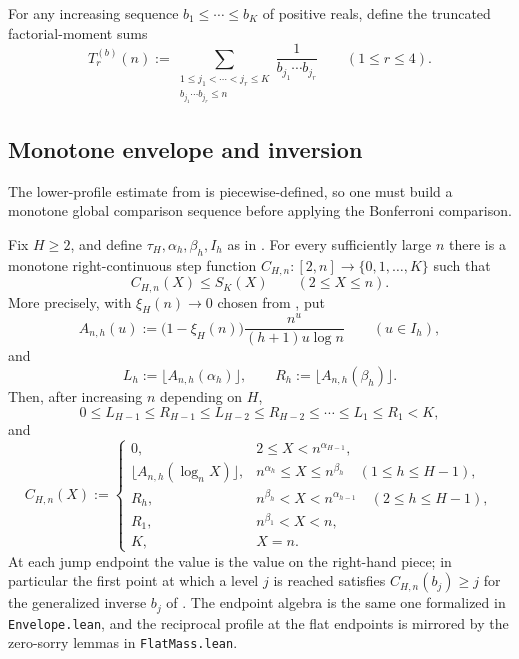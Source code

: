 For any increasing sequence $b_1\le \cdots \le b_K$ of positive reals, define
the truncated factorial-moment sums
\[
  T_r^{(b)}(n)
  :=
  \sum_{\substack{1\le j_1<\cdots<j_r\le K\\b_{j_1}\cdots b_{j_r}\le n}}
  \frac{1}{b_{j_1}\cdots b_{j_r}}
  \qquad (1\le r\le 4).
\]

\subsection{Monotone envelope and inversion}

The lower-profile estimate from  is piecewise-defined, so one
must build a monotone global comparison sequence before applying the
Bonferroni comparison.

\begin{lemma}
\label{lem:right-continuous-cumulative-envelope}
Fix $H\ge 2$, and define $\tau_H,\alpha_h,\beta_h,I_h$ as in
.  For every sufficiently large $n$ there is a
monotone right-continuous step function
$C_{H,n}:[2,n]\to\{0,1,\ldots,K\}$ such that
\[
  C_{H,n}(X)\le S_K(X)\qquad(2\le X\le n).
\]
More precisely, with $\xi_H(n)\to0$ chosen from , put
\[
  A_{n,h}(u)
  :=
  \bigl(1-\xi_H(n)\bigr)\frac{n^u}{(h+1)u\log n}
  \qquad (u\in I_h),
\]
and
\[
  L_h := \lfloor A_{n,h}(\alpha_h)\rfloor,
  \qquad
  R_h := \lfloor A_{n,h}(\beta_h)\rfloor .
\]
Then, after increasing $n$ depending on $H$,
\[
  0\le L_{H-1}\le R_{H-1}\le L_{H-2}\le R_{H-2}\le \cdots \le L_1\le R_1<K,
\]
and
\[
  C_{H,n}(X):=
  \begin{cases}
    0, & 2\le X<n^{\alpha_{H-1}},\\[1mm]
    \lfloor A_{n,h}(\log_n X)\rfloor,
      & n^{\alpha_h}\le X\le n^{\beta_h}\quad (1\le h\le H-1),\\[1mm]
    R_h, & n^{\beta_h}<X<n^{\alpha_{h-1}}\quad (2\le h\le H-1),\\[1mm]
    R_1, & n^{\beta_1}<X<n,\\[1mm]
    K, & X=n.
  \end{cases}
\]
At each jump endpoint the value is the value on the right-hand piece; in
particular the first point at which a level $j$ is reached satisfies
$C_{H,n}(b_j)\ge j$ for the generalized inverse $b_j$ of
.  The endpoint algebra is the same
one formalized in \texttt{Envelope.lean}, and the reciprocal profile at the
flat endpoints is mirrored by the zero-sorry lemmas in \texttt{FlatMass.lean}.
\end{lemma}

